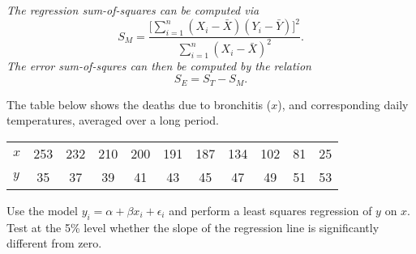 \vspace*{2ex}
\bit
\it The regression sum-of-squares can be computed via
\[
S_M = \frac{\big[\sum_{i=1}^n (X_i-\bar{X})(Y_i-\bar{Y})\big]^2}{\sum_{i=1}^n (X_i-\bar{X})^2}.
\]
\it The error sum-of-squres can then be computed by the relation 
\[
S_E = S_T - S_M.
\]
\eit

\begin{example}
The table below shows the deaths due to bronchitis ($x$), and corresponding daily temperatures, averaged over a long period.
\begin{center}
\begin{tabular}{lcccccccccc}\hline
$x$ & 253 & 232 & 210 & 200 & 191 & 187 & 134 & 102 & 81 & 25 \\
$y$ & 35 & 37 & 39 & 41 & 43 & 45 & 47 & 49 & 51 & 53 \\ \hline
\end{tabular}
\end{center}
Use the model $y_{i} = {\alpha} + {\beta}x_{i} + {\epsilon}_{i}$ and perform a least squares regression of $y$ on $x$. Test at the 5\% level whether the slope of the regression line is significantly different from zero.
\end{example}

